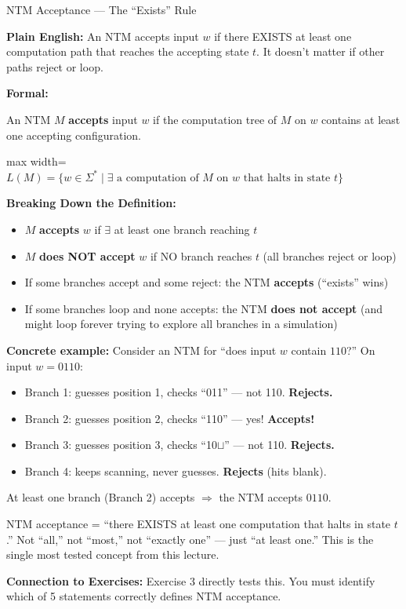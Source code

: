 \documentclass[11pt,a4paper]{article}
\newcommand{\fitmath}[1]{\begin{adjustbox}{max width=\linewidth}$\displaystyle #1$\end{adjustbox}}
\newcommand{\kt}[1]{\par\vspace{0.3em}\colorbox{yellow!60}{\parbox{\dimexpr\linewidth-2\fboxsep}{#1}}\vspace{0.3em}}
\begin{document}
\begin{definitionbox}{NTM Acceptance --- The ``Exists'' Rule}

\textbf{Plain English:} An NTM accepts input $w$ if there EXISTS at least one computation path that reaches the accepting state $t$. It doesn't matter if other paths reject or loop.

\textbf{Formal:}

An NTM $M$ \textbf{accepts} input $w$ if the computation tree of $M$ on $w$ contains at least one accepting configuration.

\fitmath{L(M) = \{w \in \Sigma^* \mid \exists \text{ a computation of } M \text{ on } w \text{ that halts in state } t\}}

\textbf{Breaking Down the Definition:}
\begin{itemize}[nosep]
\item $M$ \textbf{accepts} $w$ if $\exists$ at least one branch reaching $t$
\item $M$ \textbf{does NOT accept} $w$ if NO branch reaches $t$ (all branches reject or loop)
\item If some branches accept and some reject: the NTM \textbf{accepts} (``exists'' wins)
\item If some branches loop and none accepts: the NTM \textbf{does not accept} (and might loop forever trying to explore all branches in a simulation)
\end{itemize}

\textbf{Concrete example:} Consider an NTM for ``does input $w$ contain $110$?'' On input $w = 0110$:
\begin{itemize}[nosep]
\item Branch 1: guesses position 1, checks ``011'' --- not 110. \textbf{Rejects.}
\item Branch 2: guesses position 2, checks ``110'' --- yes! \textbf{Accepts!}
\item Branch 3: guesses position 3, checks ``10$\sqcup$'' --- not 110. \textbf{Rejects.}
\item Branch 4: keeps scanning, never guesses. \textbf{Rejects} (hits blank).
\end{itemize}
At least one branch (Branch 2) accepts $\Rightarrow$ the NTM accepts $0110$.

\kt{NTM acceptance = ``there EXISTS at least one computation that halts in state $t$.'' Not ``all,'' not ``most,'' not ``exactly one'' --- just ``at least one.'' This is the single most tested concept from this lecture.}

\textbf{Connection to Exercises:} Exercise 3 directly tests this. You must identify which of 5 statements correctly defines NTM acceptance.
\end{definitionbox}
\end{document}
